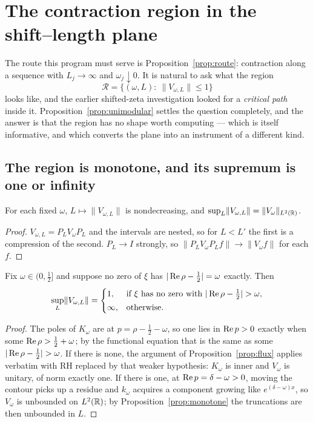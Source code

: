 \section{The contraction region in the shift--length plane}\label{sec:region}

The route this program must serve is Proposition~\ref{prop:route}: contraction
along a sequence with $L_j\to\infty$ and $\omega_j\downarrow0$. It is natural to
ask what the region
\[
 \mathcal R=\big\{(\omega,L):\ \lVert V_{\omega,L}\rVert\leq1\big\}
\]
looks like, and the earlier shifted-zeta investigation
\cite{CriticalPath,CumulativePath} looked for a \emph{critical path} inside it.
Proposition~\ref{prop:unimodular} settles the question completely, and the answer
is that the region has no shape worth computing --- which is itself informative,
and which converts the plane into an instrument of a different kind.

\subsection{The region is monotone, and its supremum is one or infinity}

\begin{proposition}[Monotonicity]\label{prop:monotone}
For each fixed $\omega$, $L\mapsto\lVert V_{\omega,L}\rVert$ is nondecreasing, and
$\sup_L\lVert V_{\omega,L}\rVert=\lVert V_\omega\rVert_{L^2(\mathbb R)}$.
\end{proposition}

\begin{proof}
$V_{\omega,L}=P_LV_\omega P_L$ and the intervals are nested, so for $L<L'$ the
first is a compression of the second. $P_L\to I$ strongly, so
$\lVert P_LV_\omega P_Lf\rVert\to\lVert V_\omega f\rVert$ for each $f$.
\end{proof}

\begin{proposition}[Dichotomy]\label{prop:dichotomy}
Fix $\omega\in(0,\frac12]$ and suppose no zero of $\xi$ has
$|\operatorname{Re}\rho-\frac12|=\omega$ exactly. Then
\[
 \sup_L\lVert V_{\omega,L}\rVert=
 \begin{cases}
 1,&\text{if $\xi$ has no zero with }|\re\rho-\tfrac12|>\omega,\\[2pt]
 \infty,&\text{otherwise.}
 \end{cases}
\]
\end{proposition}

\begin{proof}
The poles of $K_\omega$ are at $p=\rho-\frac12-\omega$, so one lies in
$\operatorname{Re} p>0$ exactly when some $\operatorname{Re}\rho>\frac12+\omega$; by the functional equation
that is the same as some $|\re\rho-\frac12|>\omega$. If there is none, the
argument of Proposition~\ref{prop:flux} applies verbatim with RH replaced by that
weaker hypothesis: $K_\omega$ is inner and $V_\omega$ is unitary, of norm exactly
one. If there is one, at $\operatorname{Re} p=\delta-\omega>0$, moving the contour picks up a
residue and $k_\omega$ acquires a component growing like $e^{(\delta-\omega)x}$,
so $V_\omega$ is unbounded on $L^2(\mathbb R)$; by Proposition~\ref{prop:monotone} the
truncations are then unbounded in $L$.
\end{proof}

